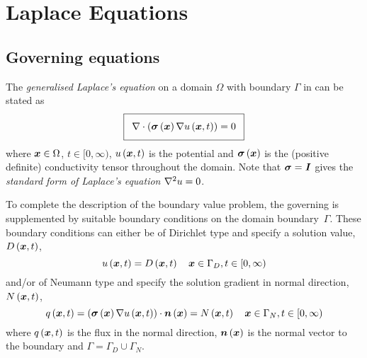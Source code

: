 \section{Laplace Equations}
\label{sec:LaplaceEquations}


\subsection{Governing equations}

The \emph{generalised Laplace's equation} on a domain $\Omega$ with boundary $\Gamma$
in \OpenCMISS can be stated as
\begin{equation}
  \addtolength{\fboxsep}{5pt}
  \boxed{
    \divergence{}{\pbrac{\fnof{\conductivitytensor}{\vectr{x}}\gradient{}{\fnof{u}{\vectr{x},t}}}}=0
  }
  \label{eqn:GeneralisedLaplaceEquation}
\end{equation}
where $ \boldsymbol{x} \in\Omega$, $t\in[0,\infty)$, $ u\left(  \boldsymbol{x} ,t \right) $ is the potential and 
$  \boldsymbol{\mathit{ \sigma }} \left(  \boldsymbol{x}  \right) $ is the (positive definite) conductivity
tensor throughout the domain. Note that $ \boldsymbol{\mathit{ \sigma }} =\boldsymbol{\mathit{I}}$ gives 
the \emph{standard form of Laplace's equation} \ie $\laplacian{}{u}=0$.

To complete the description of the boundary value problem,
the governing  is supplemented
by suitable boundary conditions on the domain boundary~$\Gamma$.
These boundary conditions can either be of Dirichlet type and specify a
solution value, $ D\left(  \boldsymbol{x} ,t \right) $, \ie
\begin{equation}
  \fnof{u}{\vectr{x},t} = \fnof{D}{\vectr{x},t} \quad \vectr{x}\in\Gamma_{D},t\in[0,\infty)
  \label{eqn:LaplaceDirichletBC} 
\end{equation}
and/or of Neumann type and specify the solution gradient in normal direction,
$ N\left(  \boldsymbol{x} ,t \right) $, \ie
\begin{equation}
  \fnof{q}{\vectr{x},t} = \dotprod{\pbrac{\fnof{\conductivitytensor}{\vectr{x}}
      \gradient{}{\fnof{u}{\vectr{x},t}}}}{\fnof{\normal}{\vectr{x}}} =
  \fnof{N}{\vectr{x},t} \quad \vectr{x}\in\Gamma_{N},t\in[0,\infty)
  \label{eqn:LaplaceNeumannBC} 
\end{equation}
where $ q\left(  \boldsymbol{x} ,t \right) $ is the flux in the normal direction, $  \boldsymbol{n} \left(  \boldsymbol{x}  \right) $ is the normal
vector to the boundary and $\Gamma = \Gamma_D \cup \Gamma_N$.

